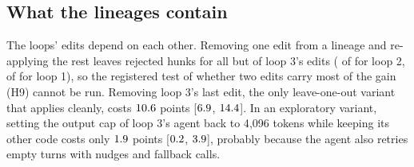 \subsection{What the lineages contain}
The loops' edits depend on each other. Removing one edit from a lineage and re-applying the rest leaves rejected hunks
for all but \vlinThreeClean{} of loop 3's \vlinThreeN{} edits (\vlinTwoClean{} of \vlinTwoN{} for loop 2, \vlinOneClean{}
of \vlinOneN{} for loop 1), so the registered test of whether two edits carry most of the gain (H9) cannot be run.
Removing loop 3's last edit, the only leave-one-out variant that applies cleanly, costs $10.6$ points
[$6.9$, $14.4$]. In an exploratory variant, setting the output cap of loop 3's agent back to 4{,}096 tokens while keeping
its other code costs only $1.9$ points [$0.2$, $3.9$], probably because the
agent also retries empty turns with nudges and fallback calls.

